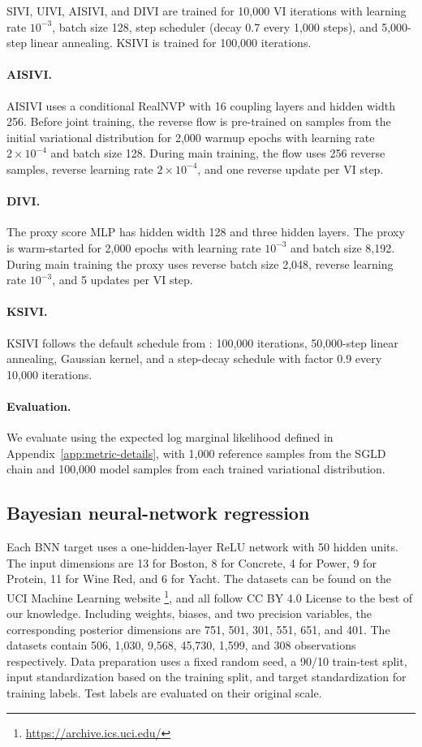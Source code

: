 SIVI, UIVI, AISIVI, and DIVI are trained for 10,000 VI iterations with learning rate $10^{-3}$, batch size 128, step scheduler (decay 0.7 every 1,000 steps), and 5,000-step linear annealing.  KSIVI is trained for 100,000 iterations.

\paragraph{AISIVI.}
AISIVI uses a conditional RealNVP with 16 coupling layers and hidden width 256.  Before joint training, the reverse flow is pre-trained on samples from the initial variational distribution for 2,000 warmup epochs with learning rate $2 \times 10^{-4}$ and batch size 128.  During main training, the flow uses 256 reverse samples, reverse learning rate $2 \times 10^{-4}$, and one reverse update per VI step.

\paragraph{DIVI.}
The proxy score MLP has hidden width 128 and three hidden layers.  The proxy is warm-started for 2,000 epochs with learning rate $10^{-3}$ and batch size 8,192.  During main training the proxy uses reverse batch size 2,048, reverse learning rate $10^{-3}$, and 5 updates per VI step.

\paragraph{KSIVI.}
KSIVI follows the default schedule from \citet{cheng2024kernel}: 100,000 iterations, 50,000-step linear annealing, Gaussian kernel, and a step-decay schedule with factor 0.9 every 10,000 iterations.

\paragraph{Evaluation.}
We evaluate using the expected log marginal likelihood defined in Appendix~\ref{app:metric-details}, with 1,000 reference samples from the SGLD chain and 100,000 model samples from each trained variational distribution.

\subsection{Bayesian neural-network regression}
\label{app:bnn-details}

Each BNN target uses a one-hidden-layer ReLU network with 50 hidden units.  The input dimensions are 13 for Boston, 8 for Concrete, 4 for Power, 9 for Protein, 11 for Wine Red, and 6 for Yacht. The datasets can be found on the UCI Machine Learning website \footnote{\url{https://archive.ics.uci.edu/}}, and all follow CC BY 4.0 License to the best of our knowledge. Including weights, biases, and two precision variables, the corresponding posterior dimensions are 751, 501, 301, 551, 651, and 401.  The datasets contain 506, 1,030, 9,568, 45,730, 1,599, and 308 observations respectively.  Data preparation uses a fixed random seed, a 90/10 train-test split, input standardization based on the training split, and target standardization for training labels.  Test labels are evaluated on their original scale.

